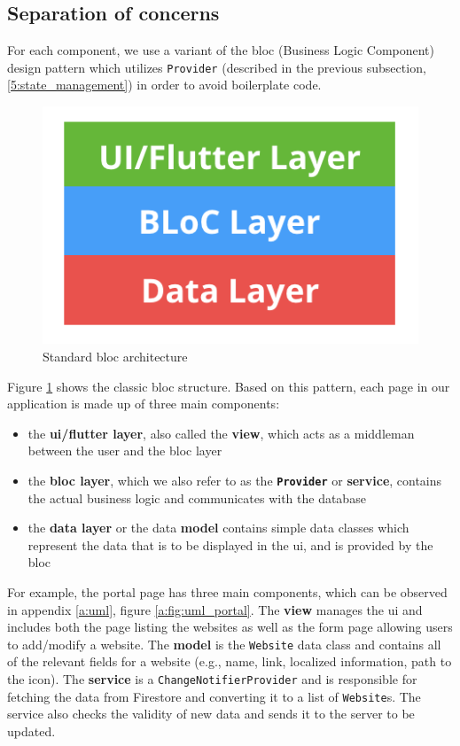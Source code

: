 \subsection{Separation of concerns} \label{5:separation}

For each component, we use a variant of the \gls{bloc} (Business Logic Component) design pattern which utilizes \texttt{Provider} (described in the previous subsection, \ref{5:state_management}) in order to avoid boilerplate code.

\begin{figure}
    \centering
    \includegraphics[width=.25\columnwidth]{figures/bloc.png}
    \caption{Standard \gls{bloc} architecture}
    \label{5:fig:bloc}
\end{figure}

Figure \ref{5:fig:bloc} shows the classic \gls{bloc} structure. Based on this pattern, each page in our application is made up of three main components:
\begin{itemize}
    \setlength{\topsep}{0.5pt}
    \setlength{\itemsep}{0.5pt}
    \setlength{\parsep}{0.5pt}
    \item the \textbf{\acrshort{ui}/\gls{flutter} layer}, also called the \textbf{view}, which acts as a middleman between the user and the \gls{bloc} layer
    \item the \textbf{\gls{bloc} layer}, which we also refer to as the \textbf{\texttt{Provider}} or \textbf{service}, contains the actual business logic and communicates with the database
    \item the \textbf{data layer} or the data \textbf{model} contains simple data classes which represent the data that is to be displayed in the \acrshort{ui}, and is provided by the \gls{bloc}
\end{itemize}

For example, the portal page has three main components, which can be observed in appendix \ref{a:uml}, figure \ref{a:fig:uml_portal}. The \textbf{view} manages the \acrshort{ui} and includes both the page listing the websites as well as the form page allowing users to add/modify a website. The \textbf{model} is the \texttt{Website} data class and contains all of the relevant fields for a website (e.g., name, link, localized information, path to the icon). The \textbf{service} is a \texttt{ChangeNotifierProvider} and is responsible for fetching the data from Firestore and converting it to a list of \texttt{Website}s. The service also checks the validity of new data and sends it to the server to be updated.

